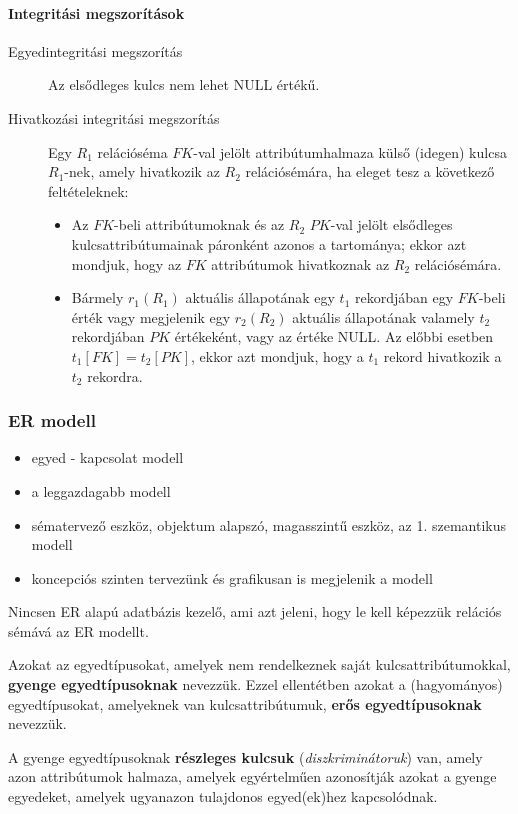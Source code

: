 \paragraph{Integritási megszorítások}
\begin{description}
	\item[Egyedintegritási megszorítás] Az elsődleges kulcs nem lehet NULL értékű.
	\item[Hivatkozási integritási megszorítás] Egy $R_1$ relációséma $FK$-val jelölt attribútumhalmaza külső (idegen) kulcsa $R_1$-nek, amely hivatkozik az $R_2$ relációsémára, ha eleget tesz a következő feltételeknek:
	\begin{itemize}
		\item Az $FK$-beli attribútumoknak és az $R_2$ $PK$-val jelölt elsődleges kulcsattribútumainak páronként azonos a tartománya; ekkor azt mondjuk, hogy az $FK$ attribútumok hivatkoznak az $R_2$ relációsémára.
		\item Bármely $r_1(R_1)$ aktuális állapotának egy $t_1$ rekordjában egy $FK$-beli érték vagy megjelenik egy $r_2(R_2)$ aktuális állapotának valamely $t_2$ rekordjában $PK$ értékeként, vagy az értéke NULL. Az előbbi esetben $t_1[FK] = t_2[PK]$, ekkor azt mondjuk, hogy a $t_1$ rekord hivatkozik a $t_2$ rekordra.
	\end{itemize}
\end{description}

\subsubsection{ER modell}
\begin{itemize}[nosep]
	\item egyed - kapcsolat modell
	\item a leggazdagabb modell
	\item sématervező eszköz, objektum alapszó, magasszintű eszköz, az 1. szemantikus modell
	\item koncepciós szinten tervezünk és grafikusan is megjelenik a modell
\end{itemize}
\begin{note}
Nincsen ER alapú adatbázis kezelő, ami azt jeleni, hogy le kell képezzük relációs sémává az ER modellt.
\end{note}
\begin{definition}[Egyedtípusok]
	Azokat az egyedtípusokat, amelyek nem rendelkeznek saját kulcsattribútumokkal, \textbf{gyenge egyedtípusoknak} nevezzük. Ezzel ellentétben azokat a (hagyományos) egyedtípusokat, 	amelyeknek van kulcsattribútumuk, \textbf{erős egyedtípusoknak} nevezzük.
\end{definition}
\begin{definition}
	A gyenge egyedtípusoknak \textbf{részleges kulcsuk} (\emph{diszkriminátoruk}) van, amely azon attribútumok halmaza, amelyek egyértelműen azonosítják azokat a gyenge egyedeket, amelyek ugyanazon tulajdonos egyed(ek)hez kapcsolódnak.
\end{definition}

